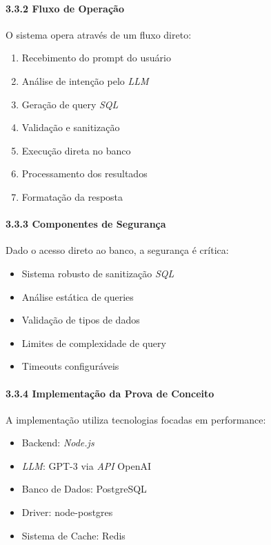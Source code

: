 \documentclass[
]{article}
\providecommand{\tightlist}{%
  \setlength{\itemsep}{0pt}\setlength{\parskip}{0pt}}
\begin{document}
\paragraph{3.3.2 Fluxo de Operação}\label{fluxo-de-operauxe7uxe3o-1}

O sistema opera através de um fluxo direto:

\begin{enumerate}
\def\labelenumi{\arabic{enumi}.}
\tightlist
\item
  Recebimento do prompt do usuário
\item
  Análise de intenção pelo \emph{LLM}
\item
  Geração de query \emph{SQL}
\item
  Validação e sanitização
\item
  Execução direta no banco
\item
  Processamento dos resultados
\item
  Formatação da resposta
\end{enumerate}

\paragraph{3.3.3 Componentes de
Segurança}\label{componentes-de-seguranuxe7a-2}

Dado o acesso direto ao banco, a segurança é crítica:

\begin{itemize}
\tightlist
\item
  Sistema robusto de sanitização \emph{SQL}
\item
  Análise estática de queries
\item
  Validação de tipos de dados
\item
  Limites de complexidade de query
\item
  Timeouts configuráveis
\end{itemize}

\paragraph{3.3.4 Implementação da Prova de
Conceito}\label{implementauxe7uxe3o-da-prova-de-conceito-2}

A implementação utiliza tecnologias focadas em performance:

\begin{itemize}
\tightlist
\item
  Backend: \emph{Node.js}
\item
  \emph{LLM}: GPT-3 via \emph{API} OpenAI
\item
  Banco de Dados: PostgreSQL
\item
  Driver: node-postgres
\item
  Sistema de Cache: Redis
\end{itemize}
\end{document}
